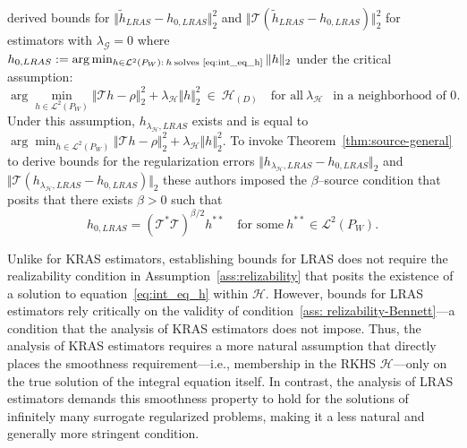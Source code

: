 \documentclass[twoside,11pt]{article}
\newcommand{\mc}{\mathcal}
\begin{document}
 \citet{bennett2023source} derived bounds for $\Vert \tilde {h}_{LRAS} - h_{0,LRAS} \Vert_2^2$ and $\Vert \mc{T}(\tilde {h}_{LRAS} - h_{0,LRAS}) \Vert_2^2$  for estimators with $\lambda_{\mc{G}}=0$ where $h_{0,LRAS}:=\arg\min_{h\in \mc{L}^2(P_W): \: h \:\text {solves~\eqref{eq:int_eq_h}}}\Vert h\Vert_2$ under the critical assumption: 
\begin{equation}
\arg\min_{h\in\mc{L}^2(P_W)}\Vert \mc{T}h - \rho \Vert_2^2 +\lambda_{\mc{H}}\Vert h \Vert_2^2 \: \in \: \mc{H}_{(D)} \quad \text{for all} \: \lambda_{\mc{H}} \:\: \text{ in a neighborhood of 0}.
\label{ass: relizability-Bennett}
\end{equation}
Under this assumption, $h_{\lambda_{\mc{H}},LRAS}$ exists and is equal to $\arg\min_{h\in\mc{L}^2(P_W)}\Vert \mc{T}h - \rho \Vert_2^2 +\lambda_{\mc{H}}\Vert h \Vert_2^2$. To invoke Theorem~\ref{thm:source-general} to derive bounds for the regularization errors $\Vert h_{\lambda_{\mc{H}},LRAS} - h_{0,LRAS}\Vert_2$ and $\Vert \mc{T}(h_{\lambda_{\mc{H}},LRAS} - h_{0,LRAS})\Vert_2$ these authors imposed the $\beta$--source condition that posits that there exists $\beta>0$ such that
\begin{equation}
    h_{0,LRAS}=\left(\mc{T}^*\mc{T}\right)^{\beta/2}h^{**} \quad \text{for some} \:h^{**} \in \mc{L}^2(P_W).
    \label{eq:source_bennett}
\end{equation}

Unlike for KRAS estimators, establishing bounds for LRAS does not require the realizability condition in Assumption~\ref{ass:relizability} that posits the existence of a solution to equation~\eqref{eq:int_eq_h} within $\mc{H}$. However, bounds for LRAS estimators rely critically on the validity of condition~\eqref{ass: relizability-Bennett}---a condition that the analysis of KRAS estimators does not impose. Thus, the analysis of KRAS estimators requires a more natural assumption that directly places the smoothness requirement---i.e., membership in the RKHS $\mc{H}$---only on the true solution of the integral equation itself. In contrast, the analysis of LRAS estimators demands this smoothness property to hold for the solutions of infinitely many surrogate regularized problems, making it a less natural and generally more stringent condition. 
\end{document}
